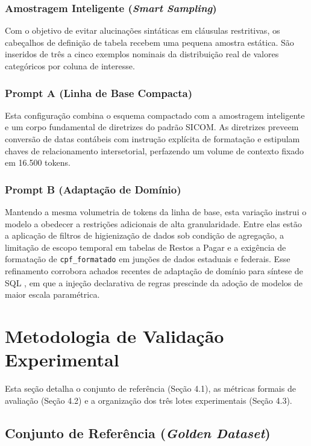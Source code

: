 \documentclass[12pt]{article}
\begin{document}
\subsubsection*{Amostragem Inteligente (\textit{Smart Sampling})}
Com o objetivo de evitar alucinações sintáticas em cláusulas restritivas, os cabeçalhos de definição de tabela recebem uma pequena amostra estática. São inseridos de três a cinco exemplos nominais da distribuição real de valores categóricos por coluna de interesse.

\subsubsection*{Prompt A (Linha de Base Compacta)}
Esta configuração combina o esquema compactado com a amostragem inteligente e um corpo fundamental de diretrizes do padrão SICOM. As diretrizes preveem conversão de datas contábeis com instrução explícita de formatação e estipulam chaves de relacionamento intersetorial, perfazendo um volume de contexto fixado em 16.500 tokens.

\subsubsection*{Prompt B (Adaptação de Domínio)}
Mantendo a mesma volumetria de tokens da linha de base, esta variação instrui o modelo a obedecer a restrições adicionais de alta granularidade. Entre elas estão a aplicação de filtros de higienização de dados sob condição de agregação, a limitação de escopo temporal em tabelas de Restos a Pagar e a exigência de formatação de \texttt{cpf\_formatado} em junções de dados estaduais e federais. Esse refinamento corrobora achados recentes de adaptação de domínio para síntese de SQL \cite{Tian2025DomainAdapt,Hong2025Survey}, em que a injeção declarativa de regras prescinde da adoção de modelos de maior escala paramétrica.

\section{Metodologia de Validação Experimental}

Esta seção detalha o conjunto de referência (Seção 4.1), as métricas formais de avaliação (Seção 4.2) e a organização dos três lotes experimentais (Seção 4.3).

\subsection{Conjunto de Referência (\textit{Golden Dataset})}
\end{document}
